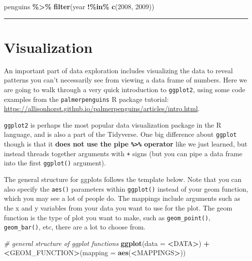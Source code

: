 \documentclass[
]{book}
\newenvironment{Shaded}{\begin{snugshade}}{\end{snugshade}}
\newcommand{\AttributeTok}[1]{\textcolor[rgb]{0.13,0.29,0.53}{#1}}
\newcommand{\CommentTok}[1]{\textcolor[rgb]{0.56,0.35,0.01}{\textit{#1}}}
\newcommand{\DecValTok}[1]{\textcolor[rgb]{0.00,0.00,0.81}{#1}}
\newcommand{\ErrorTok}[1]{\textcolor[rgb]{0.64,0.00,0.00}{\textbf{#1}}}
\newcommand{\FunctionTok}[1]{\textcolor[rgb]{0.13,0.29,0.53}{\textbf{#1}}}
\newcommand{\NormalTok}[1]{#1}
\newcommand{\SpecialCharTok}[1]{\textcolor[rgb]{0.81,0.36,0.00}{\textbf{#1}}}
\begin{document}
\begin{enumerate}
\begin{Shaded}
\begin{Highlighting}[]
\NormalTok{penguins }\SpecialCharTok{\%\textgreater{}\%} 
    \FunctionTok{filter}\NormalTok{(year }\SpecialCharTok{!\%in\%} \FunctionTok{c}\NormalTok{(}\DecValTok{2008}\NormalTok{, }\DecValTok{2009}\NormalTok{))}
\end{Highlighting}
\end{Shaded}
\end{enumerate}

\begin{center}\rule{0.5\linewidth}{0.5pt}\end{center}

\hypertarget{visualization}{%
\section{Visualization}\label{visualization}}

An important part of data exploration includes visualizing the data to reveal patterns you can't necessarily see from viewing a data frame of numbers. Here we are going to walk through a very quick introduction to \texttt{ggplot2}, using some code examples from the \texttt{palmerpenguins} R package tutorial: \url{https://allisonhorst.github.io/palmerpenguins/articles/intro.html}.

\texttt{ggplot2} is perhaps the most popular data visualization package in the R language, and is also a part of the Tidyverse. One big difference about \texttt{ggplot} though is that it \textbf{does not use the pipe \texttt{\%\textgreater{}\%} operator} like we just learned, but instead threads together arguments with \texttt{+} signs (but you can pipe a data frame into the first \texttt{ggplot()} argument).

The general structure for ggplots follows the template below. Note that you can also specify the \texttt{aes()} parameters within \texttt{ggplot()} instead of your geom function, which you may see a lot of people do. The mappings include arguments such as the x and y variables from your data you want to use for the plot. The geom function is the type of plot you want to make, such as \texttt{geom\_point()}, \texttt{geom\_bar()}, etc, there are a lot to choose from.

\begin{Shaded}
\begin{Highlighting}[]
\CommentTok{\# general structure of ggplot functions}
\FunctionTok{ggplot}\NormalTok{(}\AttributeTok{data =} \SpecialCharTok{\textless{}}\NormalTok{DATA}\SpecialCharTok{\textgreater{}}\NormalTok{) }\SpecialCharTok{+} 
  \ErrorTok{\textless{}}\NormalTok{GEOM\_FUNCTION}\SpecialCharTok{\textgreater{}}\NormalTok{(}\AttributeTok{mapping =} \FunctionTok{aes}\NormalTok{(}\SpecialCharTok{\textless{}}\NormalTok{MAPPINGS}\SpecialCharTok{\textgreater{}}\NormalTok{))}
\end{Highlighting}
\end{Shaded}
\end{document}
